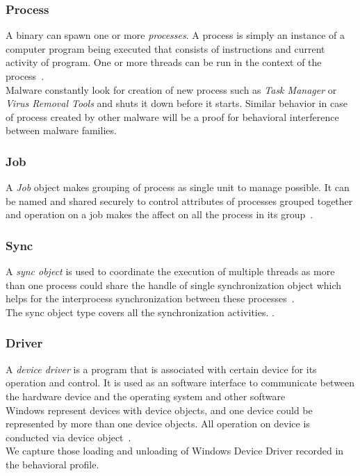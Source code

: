 \subsubsection{Process}
\label{ssub:Process}
A binary can spawn one or more \emph{processes}.
A process is simply an instance of a computer program being executed that consists of instructions and current activity of program.
One or more threads can be run in the context of the process~\cite[]{msprocess}.\\
Malware constantly look for creation of new process such as \emph{Task Manager} or \emph{Virus Removal Tools} and shuts it down before it starts.
Similar behavior in case of process created by other malware will be a proof for behavioral interference between malware families.
\subsubsection{Job}
\label{ssub:Job}
A \emph{Job} object makes grouping of process as single unit to manage possible.
It can be named and shared securely to control attributes of processes grouped together and operation on a job makes the affect on all the process in its group~\cite[]{msjob}.
\subsubsection{Sync}
\label{ssub:Sync}
A \emph{sync object} is used to coordinate the execution of multiple threads as more than one process could share the handle of single synchronization object which helps for the interprocess synchronization between these processes~\cite[]{mssync}.\\
The sync object type covers all the synchronization activities.
\cite[]{mssync}.
\subsubsection{Driver}
\label{ssub:Driver}
A \emph{device driver } is a program that is associated with certain device for its operation and control. It is used as an software interface to communicate between the hardware device and the operating system and other software~\cite[Device Driver]{devicedriver} \\
Windows represent devices with device objects, and one device could be represented by more than one device objects. All operation on device is conducted via device object~\cite[]{msdevice}.\\
We capture those loading and unloading of Windows Device Driver recorded in the behavioral profile.\\

